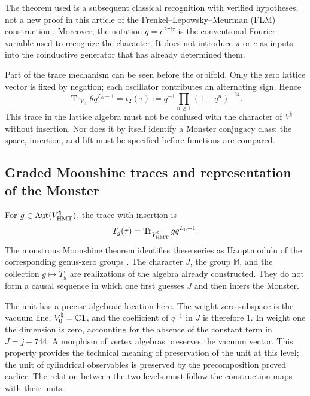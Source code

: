 The theorem used is a subsequent classical recognition with verified
hypotheses, not a new proof in this article of the
Frenkel--Lepowsky--Meurman (FLM) construction \cite{flm}.
Moreover, the notation $q=e^{2\pi i\tau}$ is the conventional Fourier
variable used to recognize the character. It does not introduce $\pi$
or $e$ as inputs into the coinductive generator that has already determined them.

Part of the trace mechanism can be seen before the orbifold.
Only the zero lattice vector is fixed by negation; each
oscillator contributes an alternating sign. Hence
\[
 \operatorname{Tr}_{V_\Lambda}\theta q^{L_0-1}
   =t_2(\tau)
   :=q^{-1}\prod_{n\geq1}(1+q^n)^{-24}.
\]
This trace in the lattice algebra must not be confused with the
character of $V^\natural$ without insertion. Nor does it by
itself identify a Monster conjugacy class: the space, insertion,
and lift must be specified before functions are compared.







\subsection{Graded Moonshine traces and representation of the Monster}
\label{exc:alcance}

For $g\in\operatorname{Aut}(V^\natural_{\rm HMT})$, the trace
with insertion is
\[
 T_g(\tau)=
 \operatorname{Tr}_{V^\natural_{\rm HMT}}gq^{L_0-1}.
\]
The monstrous Moonshine theorem identifies these series as
Hauptmoduln of the corresponding genus-zero groups
\cite[Theorem~1.1]{borcherds}.
The character $J$, the group $\mathbb M$, and the collection $g\mapsto T_g$
are realizations of the algebra already constructed. They do not form a causal
sequence in which one first guesses $J$ and then infers the Monster.

The unit has a precise algebraic location here. The weight-zero
subspace is the vacuum line, \(V^\natural_0=\mathbb C\mathbf1\), and
the coefficient of \(q^{-1}\) in \(J\) is therefore \(1\). In weight one
the dimension is zero, accounting for the absence of the constant term
in \(J=j-744\). A morphism of vertex algebras preserves the vacuum
vector. This property provides the technical meaning of preservation
of the unit at this level; the unit of cylindrical observables
is preserved by the precomposition proved earlier. The relation
between the two levels must follow the construction maps with their units.

